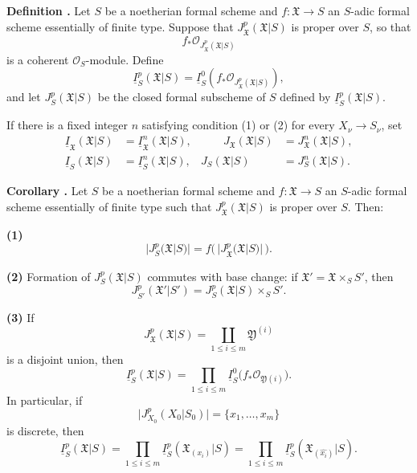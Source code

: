 \medskip
\noindent\textbf{Definition .}
Let $S$ be a noetherian formal scheme and
$f:\mathfrak X\longrightarrow S$ an $S$-adic formal scheme
essentially of finite type. Suppose that
$J_{\mathfrak X}^p(\mathfrak X|S)$ is proper over $S$, so that
\[
f_*\mathcal O_{J_{\mathfrak X}^p(\mathfrak X|S)}
\]
is a coherent $\mathcal O_S$-module. Define
\[
\underline I_S^p(\mathfrak X|S)
=\underline I_S^0\!\left(
 f_*\mathcal O_{J_{\mathfrak X}^p(\mathfrak X|S)}
\right),
\]
and let $J_S^p(\mathfrak X|S)$ be the closed formal subscheme of $S$
defined by $\underline I_S^p(\mathfrak X|S)$.

If there is a fixed integer $n$ satisfying condition (1) or
(2) for every $X_\nu\longrightarrow S_\nu$, set
\[
\begin{aligned}
\underline I_{\mathfrak X}(\mathfrak X|S)
 &=\underline I_{\mathfrak X}^n(\mathfrak X|S),
&\qquad
J_{\mathfrak X}(\mathfrak X|S)
 &=J_{\mathfrak X}^n(\mathfrak X|S),\\
\underline I_S(\mathfrak X|S)
 &=\underline I_S^n(\mathfrak X|S),
&
J_S(\mathfrak X|S)
 &=J_S^n(\mathfrak X|S).
\end{aligned}
\]

\medskip
\noindent\textbf{Corollary .}
Let $S$ be a noetherian formal scheme and
$f:\mathfrak X\longrightarrow S$ an $S$-adic formal scheme
essentially of finite type such that
$J_{\mathfrak X}^p(\mathfrak X|S)$ is proper over $S$. Then:

\smallskip
\noindent\textbf{(1)}
\[
\bigl|J_S^p(\mathfrak X|S)\bigr|
=f\bigl(\,|J_{\mathfrak X}^p(\mathfrak X|S)|\,\bigr).
\]


\smallskip
\noindent\textbf{(2)} Formation of $J_S^p(\mathfrak X|S)$ commutes
with base change: if $\mathfrak X'=\mathfrak X\times_SS'$, then
\[
J_{S'}^p(\mathfrak X'|S')
=J_S^p(\mathfrak X|S)\times_SS'.
\]

\smallskip
\noindent\textbf{(3)} If
\[
J_{\mathfrak X}^p(\mathfrak X|S)
=\coprod_{1\leq i\leq m}\mathfrak Y^{(i)}
\]
is a disjoint union, then
\[
\underline I_S^p(\mathfrak X|S)
=\prod_{1\leq i\leq m}
 \underline I_S^0\bigl(f_*\mathcal O_{\mathfrak Y(i)}\bigr).
\]
In particular, if
\[
\bigl|J_{X_0}^p(X_0|S_0)\bigr|=\{x_1,\ldots,x_m\}
\]
is discrete, then
\[
\underline I_S^p(\mathfrak X|S)
=\prod_{1\leq i\leq m}
 \underline I_S^p(\mathfrak X_{(x_i)}|S)
=\prod_{1\leq i\leq m}
 \underline I_S^p(\mathfrak X_{(\widehat{x_i})}|S).
\]

